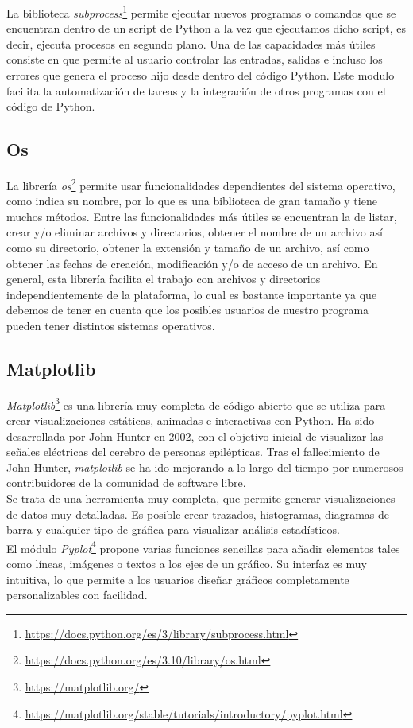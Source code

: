 \documentclass[a4paper, 12pt]{book}
\begin{document}
La biblioteca \textit{subprocess}\footnote{\url{https://docs.python.org/es/3/library/subprocess.html}} permite ejecutar nuevos programas o comandos que se encuentran dentro de un script de Python a la vez que ejecutamos dicho script, es decir, ejecuta
procesos en segundo plano. Una de las capacidades más útiles consiste en que permite al usuario controlar las entradas, salidas e incluso los errores que genera el proceso hijo desde
dentro del código Python. Este modulo facilita la automatización de tareas y la integración de otros programas con el código de Python.

\subsection{Os}
\label{subsec:os}


La librería \textit{os}\footnote{\url{https://docs.python.org/es/3.10/library/os.html}} permite usar funcionalidades dependientes del sistema operativo, como indica su nombre, por lo que es una biblioteca de gran tamaño y tiene muchos métodos.
Entre las funcionalidades más útiles se encuentran la de listar, crear y/o eliminar archivos y directorios, obtener el nombre de un archivo así como su directorio, obtener la extensión y tamaño de un archivo, así como obtener las fechas de creación, modificación
y/o de acceso de un archivo. En general, esta librería facilita el trabajo con archivos y directorios independientemente de la plataforma, lo cual es bastante importante ya que debemos de tener en cuenta que los posibles usuarios de nuestro programa pueden tener distintos
sistemas operativos.

\subsection{Matplotlib}
\label{subsec:matplotlib}

\textit{Matplotlib}\footnote{\url{https://matplotlib.org/}} es una librería muy completa de código abierto que se utiliza para crear visualizaciones estáticas, animadas e interactivas con Python.
Ha sido desarrollada por John Hunter en 2002, con el objetivo inicial de visualizar las señales eléctricas del cerebro de personas epilépticas.
Tras el fallecimiento de John Hunter, \textit{matplotlib} se ha ido mejorando a lo largo del tiempo por numerosos contribuidores de la comunidad de software libre.
\\Se trata de una herramienta muy completa, que permite generar visualizaciones de datos muy detalladas. Es posible crear trazados, histogramas, diagramas de barra y
cualquier tipo de gráfica para visualizar análisis estadísticos. 
\\El módulo \textit{Pyplot}\footnote{\url{https://matplotlib.org/stable/tutorials/introductory/pyplot.html}} propone varias funciones sencillas para añadir elementos tales como líneas, imágenes o textos
a los ejes de un gráfico. Su interfaz es muy intuitiva, lo que permite a los usuarios diseñar gráficos completamente personalizables con facilidad.
\end{document}
